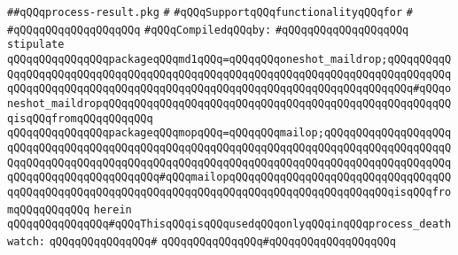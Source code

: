 \label{src/lib/std/src/threadkit/process-result.pkg}
\verb|##qQQqprocess-result.pkg|\newline
\verb|#|\newline
\verb|#qQQqSupportqQQqfunctionalityqQQqfor|\newline
\verb|#|\newline
\verb|#qQQqqQQqqQQqqQQqqQQq|\newline
\newline
\verb|#qQQqCompiledqQQqby:|\newline
\verb|#qQQqqQQqqQQqqQQqqQQq|\newline
\newline
\newline
\newline
\verb|stipulate|\newline
\verb|qQQqqQQqqQQqqQQqpackageqQQqmd1qQQq=qQQqqQQqoneshot_maildrop;qQQqqQQqqQQqqQQqqQQqqQQqqQQqqQQqqQQqqQQqqQQqqQQqqQQqqQQqqQQqqQQqqQQqqQQqqQQqqQQqqQQqqQQqqQQqqQQqqQQqqQQqqQQqqQQqqQQqqQQqqQQqqQQqqQQqqQQqqQQqqQQq#qQQqoneshot_maildropqQQqqQQqqQQqqQQqqQQqqQQqqQQqqQQqqQQqqQQqqQQqqQQqqQQqqQQqisqQQqfromqQQqqQQqqQQq|\newline
\verb|qQQqqQQqqQQqqQQqpackageqQQqmopqQQq=qQQqqQQqmailop;qQQqqQQqqQQqqQQqqQQqqQQqqQQqqQQqqQQqqQQqqQQqqQQqqQQqqQQqqQQqqQQqqQQqqQQqqQQqqQQqqQQqqQQqqQQqqQQqqQQqqQQqqQQqqQQqqQQqqQQqqQQqqQQqqQQqqQQqqQQqqQQqqQQqqQQqqQQqqQQqqQQqqQQqqQQqqQQqqQQqqQQq#qQQqmailopqQQqqQQqqQQqqQQqqQQqqQQqqQQqqQQqqQQqqQQqqQQqqQQqqQQqqQQqqQQqqQQqqQQqqQQqqQQqqQQqqQQqqQQqqQQqqQQqisqQQqfromqQQqqQQqqQQq|\newline
\verb|herein|\newline
\newline
\verb|qQQqqQQqqQQqqQQq#qQQqThisqQQqisqQQqusedqQQqonlyqQQqinqQQqprocess_deathwatch:|\newline
\verb|qQQqqQQqqQQqqQQq#|\newline
\verb|qQQqqQQqqQQqqQQq#qQQqqQQqqQQqqQQqqQQq|\newline
